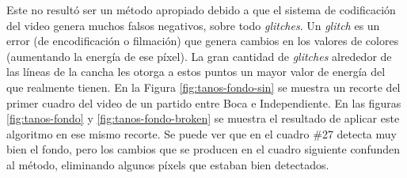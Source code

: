 Este no resultó ser un método apropiado debido a que el sistema de codificación
del video genera muchos falsos negativos, sobre todo \textit{glitches}. Un
\textit{glitch} es un error (de encodificación o filmación) que genera cambios
en los valores de colores (aumentando la energía de ese píxel). La gran
cantidad de \textit{glitches} alrededor de las líneas de la cancha les otorga a
estos puntos un mayor valor de energía del que realmente tienen. En la Figura
\ref{fig:tanos-fondo-sin} se muestra un recorte del primer cuadro del video de
un partido entre Boca e Independiente. En las figuras \ref{fig:tanos-fondo} y
\ref{fig:tanos-fondo-broken} se muestra el resultado de aplicar este algoritmo
en ese mismo recorte. Se puede ver que en el cuadro \#27 detecta muy bien el
fondo, pero los cambios que se producen en el cuadro siguiente confunden al
método, eliminando algunos píxels que estaban bien detectados.

